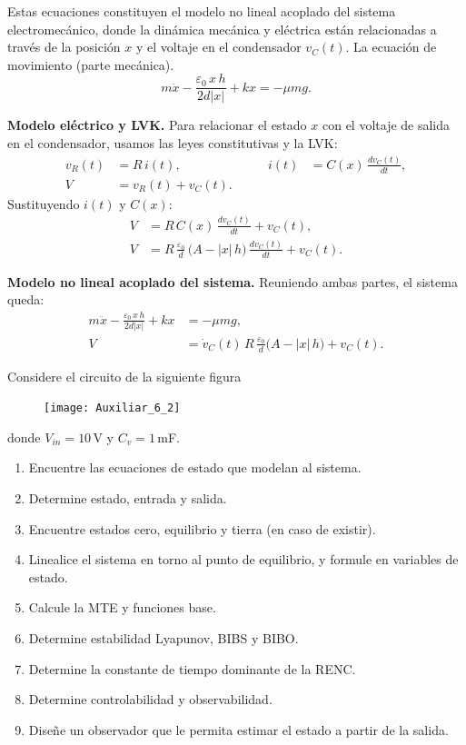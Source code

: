 \documentclass[
  11pt,
  letterpaper,
   addpoints,
  answers
  ]{exam}
\begin{document}
\begin{questions}
\begin{solution}
Estas ecuaciones constituyen el modelo no lineal acoplado del sistema electromecánico, donde la dinámica mecánica y eléctrica están relacionadas a través de la posición $x$ y el voltaje en el condensador $v_C(t)$. La ecuación de movimiento (parte mecánica).
\begin{equation}
m\ddot{x}-\frac{\varepsilon_{0}\,x\,h}{2d|x|}+k x=-\mu m g.
\end{equation}

\textbf{Modelo eléctrico y LVK.} Para relacionar el estado $x$ con el voltaje de salida en el condensador, usamos las leyes constitutivas y la LVK:
\begin{align}
v_{R}(t)&=R\,i(t),
&\qquad
i(t)&=C(x)\,\frac{dv_{C}(t)}{dt},
\\
V&=v_{R}(t)+v_{C}(t).
\end{align}
Sustituyendo $i(t)$ y $C(x)$:
\begin{align}
V&=R\,C(x)\,\frac{dv_{C}(t)}{dt}+v_{C}(t),
\\
V&=R\,\frac{\varepsilon_{0}}{d}\,\big(A-|x|\,h\big)\,\frac{dv_{C}(t)}{dt}+v_{C}(t).
\end{align}

\textbf{Modelo no lineal acoplado del sistema.} Reuniendo ambas partes, el sistema queda:
\begin{align}
m\ddot{x}-\frac{\varepsilon_{0}\,x\,h}{2d|x|}+k x&=-\mu m g, \\[4pt]
V&=\dot{v}_{C}(t)\,R\,\frac{\varepsilon_{0}}{d}\big(A-|x|\,h\big)+v_{C}(t).
\end{align}

\end{solution}

  \question Considere el circuito de la siguiente figura
  \begin{figure}[H]
    \centering
    \texttt{[image: Auxiliar\_6\_2]}
  \end{figure}

  donde $V_{in} = 10\,$V y $C_v = 1\,$mF.

  \begin{enumerate}
    \item Encuentre las ecuaciones de estado que modelan al sistema.
    \item Determine estado, entrada y salida.
    \item Encuentre estados cero, equilibrio y tierra (en caso de existir).
    \item Linealice el sistema en torno al punto de equilibrio, y formule en variables de estado.
    \item Calcule la MTE y funciones base.
    \item Determine estabilidad Lyapunov, BIBS y BIBO.
    \item Determine la constante de tiempo dominante de la RENC.
    \item Determine controlabilidad y observabilidad.
    \item Diseñe un observador que le permita estimar el estado a partir de la salida.
  \end{enumerate}
\begin{solution}


\end{solution}
\end{questions}
\end{document}
